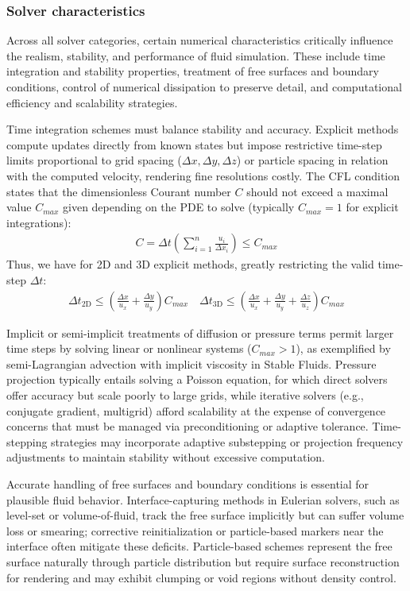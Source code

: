 \subsubsection{Solver characteristics}

Across all solver categories, certain numerical characteristics critically influence the realism, stability, and performance of fluid simulation. These include time integration and stability properties, treatment of free surfaces and boundary conditions, control of numerical dissipation to preserve detail, and computational efficiency and scalability strategies.

Time integration schemes must balance stability and accuracy. Explicit methods compute updates directly from known states but impose restrictive time-step limits proportional to grid spacing ($\Delta x, \Delta y, \Delta z$) or particle spacing in relation with the computed velocity, rendering fine resolutions costly. The CFL condition states that the dimensionless Courant number $C$ should not exceed a maximal value $C_{max}$ given depending on the PDE to solve (typically $C_{max} = 1$ for explicit integrations):
\begin{align}
    C = \Delta t \left( \sum_{i=1}^{n}{\frac{u_i}{\Delta x_i}} \right) \leq C_{max} \nonumber
\end{align}
Thus, we have for 2D and 3D explicit methods, greatly restricting the valid time-step $\Delta t$:
\begin{align}
    \Delta t_{\text{2D}} \leq \left( \frac{\Delta x}{u_x} + \frac{\Delta y}{u_y} \right) C_{max}
    \quad
    \Delta t_{\text{3D}} \leq \left( \frac{\Delta x}{u_x} + \frac{\Delta y}{u_y} + \frac{\Delta z}{u_z} \right) C_{max}
\end{align}

Implicit or semi-implicit treatments of diffusion or pressure terms permit larger time steps by solving linear or nonlinear systems ($C_{max} > 1$), as exemplified by semi-Lagrangian advection with implicit viscosity in Stable Fluids. Pressure projection typically entails solving a Poisson equation, for which direct solvers offer accuracy but scale poorly to large grids, while iterative solvers (e.g., conjugate gradient, multigrid) afford scalability at the expense of convergence concerns that must be managed via preconditioning or adaptive tolerance. Time-stepping strategies may incorporate adaptive substepping or projection frequency adjustments to maintain stability without excessive computation.

Accurate handling of free surfaces and boundary conditions is essential for plausible fluid behavior. Interface-capturing methods in Eulerian solvers, such as level-set or volume-of-fluid, track the free surface implicitly but can suffer volume loss or smearing; corrective reinitialization or particle-based markers near the interface often mitigate these deficits. Particle-based schemes represent the free surface naturally through particle distribution but require surface reconstruction for rendering and may exhibit clumping or void regions without density control. 

